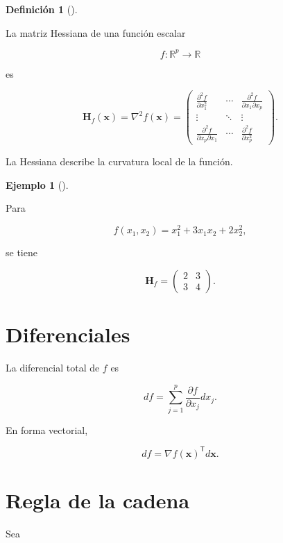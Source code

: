 \documentclass[
  spanish,
  11pt,
  letterpaper,
  DIV=11,
  numbers=noendperiod]{scrreprt}
\theoremstyle{definition}
\newtheorem{definition}{Definición}[chapter]
\theoremstyle{plain}
\theoremstyle{definition}
\newtheorem{example}{Ejemplo}[chapter]
\theoremstyle{remark}
\begin{document}
\begin{definition}[]\protect\hypertarget{def-hessiana}{}\label{def-hessiana}

La matriz Hessiana de una función escalar

\[
f:\mathbb{R}^{p}\to\mathbb{R}
\]

es

\[
\mathbf{H}_f(\mathbf{x})
=
\nabla^2f(\mathbf{x})
=
\begin{pmatrix}
\frac{\partial^2 f}{\partial x_1^2}
&
\cdots
&
\frac{\partial^2 f}{\partial x_1\partial x_p}
\\
\vdots
&
\ddots
&
\vdots
\\
\frac{\partial^2 f}{\partial x_p\partial x_1}
&
\cdots
&
\frac{\partial^2 f}{\partial x_p^2}
\end{pmatrix}.
\]

\end{definition}

La Hessiana describe la curvatura local de la función.

\begin{example}[]\protect\hypertarget{exm-hessiana}{}\label{exm-hessiana}

Para

\[
f(x_1,x_2)
=
x_1^2+3x_1x_2+2x_2^2,
\]

se tiene

\[
\mathbf{H}_f
=
\begin{pmatrix}
2 & 3\\
3 & 4
\end{pmatrix}.
\]

\end{example}

\section{Diferenciales}\label{diferenciales}

La diferencial total de \(f\) es

\[
df
=
\sum_{j=1}^{p}
\frac{\partial f}{\partial x_j}
dx_j.
\]

En forma vectorial,

\[
df
=
\nabla f(\mathbf{x})^{\mathsf T}
d\mathbf{x}.
\]

\section{Regla de la cadena}\label{regla-de-la-cadena}

Sea
\end{document}
